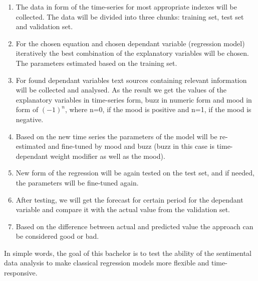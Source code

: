 \documentclass {article}
\begin{document}
\begin{enumerate}
	\item The data in form of the time-series for most appropriate indexes will be collected. The data will be divided into three chunks: training set, test set and validation set. 
	\item For the chosen equation and chosen dependant variable (regression model) iteratively the best combination of the explanatory variables will be chosen. The parameters estimated based on the training set.
	\item For found dependant variables text sources containing relevant information will be collected and analysed. As the result we get the values of the explanatory variables in time-series form, buzz in numeric form and mood in form of $(-1)^n$, where n=0, if the mood is positive and n=1, if the mood is negative.
	\item Based on the new time series the parameters of the model will be re-estimated and fine-tuned by mood and buzz (buzz in this case is time-dependant weight modifier as well as the mood).
	\item New form of the regression will be again tested on the test set, and if needed, the parameters will be fine-tuned again. 
	\item After testing, we will get the forecast for certain period for the dependant variable and compare it with the actual value from the validation set. 
	\item Based on the difference between actual and predicted value the approach can be considered good or bad.  
\end{enumerate}
In simple words, the goal of this bachelor is to test the ability of the sentimental data analysis to make classical regression models more flexible and time-responsive.
\end{document}
